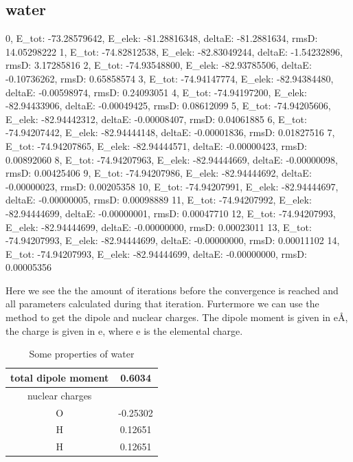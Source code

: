  \subsection{water}
 \label{subsec:water}

\begin{python}[caption={iterations for water},label={ls:Listing 7},basicstyle=\scriptsize]
0, E_tot: -73.28579642, E_elek: -81.28816348, deltaE: -81.2881634, rmsD:  14.05298222
1, E_tot: -74.82812538, E_elek: -82.83049244, deltaE: -1.54232896, rmsD:  3.17285816 
2, E_tot: -74.93548800, E_elek: -82.93785506, deltaE: -0.10736262, rmsD:  0.65858574 
3, E_tot: -74.94147774, E_elek: -82.94384480, deltaE: -0.00598974, rmsD:  0.24093051 
4, E_tot: -74.94197200, E_elek: -82.94433906, deltaE: -0.00049425, rmsD:  0.08612099
5, E_tot: -74.94205606, E_elek: -82.94442312, deltaE: -0.00008407, rmsD:  0.04061885
6, E_tot: -74.94207442, E_elek: -82.94444148, deltaE: -0.00001836, rmsD:  0.01827516
7, E_tot: -74.94207865, E_elek: -82.94444571, deltaE: -0.00000423, rmsD:  0.00892060
8, E_tot: -74.94207963, E_elek: -82.94444669, deltaE: -0.00000098, rmsD:  0.00425406
9, E_tot: -74.94207986, E_elek: -82.94444692, deltaE: -0.00000023, rmsD:  0.00205358
10, E_tot: -74.94207991, E_elek: -82.94444697, deltaE: -0.00000005, rmsD:  0.00098889
11, E_tot: -74.94207992, E_elek: -82.94444699, deltaE: -0.00000001, rmsD:  0.00047710
12, E_tot: -74.94207993, E_elek: -82.94444699, deltaE: -0.00000000, rmsD:  0.00023011
13, E_tot: -74.94207993, E_elek: -82.94444699, deltaE: -0.00000000, rmsD:  0.00011102
14, E_tot: -74.94207993, E_elek: -82.94444699, deltaE: -0.00000000, rmsD:  0.00005356
\end{python}
Here we see the the amount of iterations before the convergence is reached and 
all parameters calculated during that iteration. Furtermore we can use the 
 method to get the dipole and nuclear charges. The dipole 
moment is given in e\AA, the charge is given in e, where e is the elemental 
charge.

\begin{table}[ht]
    \centering
    \begin{tabular}{c|c}
         total dipole moment & 0.6034  \\
         \hline
         nuclear charges &  \\ 
         \hline
         O & -0.25302 \\
         H & 0.12651 \\
         H & 0.12651 \\
    \end{tabular}
    \caption{Some properties of water}
    \label{tab:number2}
\end{table}

